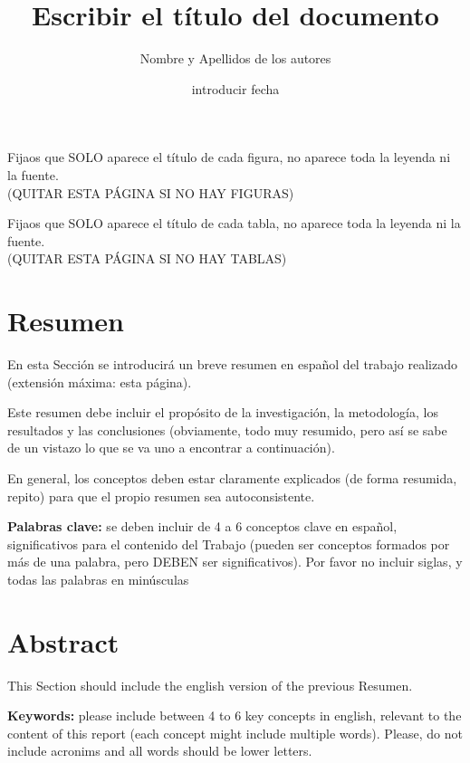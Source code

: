\documentclass[11pt,a4paper,spanish]{book}
\title{Escribir el título del documento}
\author{Nombre y Apellidos de los autores}
\date{introducir fecha}
\begin{document}
\renewcommand{\listfigurename}{Índice de figuras}
\renewcommand{\listtablename}{Índice de tablas}
\renewcommand{\contentsname}{Índice de contenidos}
\renewcommand{\figurename}{Figura}
\renewcommand{\tablename}{Tabla} 

\maketitle
\frontmatter
\tableofcontents
\listoffigures
Fijaos que SOLO aparece el título de cada figura, no aparece toda la leyenda ni la fuente. \\
(QUITAR ESTA PÁGINA SI NO HAY FIGURAS) 
\listoftables
Fijaos que SOLO aparece el título de cada tabla, no aparece toda la leyenda ni la fuente. \\
(QUITAR ESTA PÁGINA SI NO HAY TABLAS)

\chapter{Resumen}
En esta Sección se introducirá un breve resumen en español del trabajo realizado (extensión máxima: esta página). 
\newline

Este resumen debe incluir el propósito de la investigación, la metodología, los resultados y las conclusiones (obviamente, todo muy resumido, pero así se sabe de un vistazo lo que se va uno a encontrar a continuación). 
\newline

En general, los conceptos deben estar claramente explicados (de forma resumida, repito) para que el propio resumen sea autoconsistente.

\vspace{0.5cm}
{\bf Palabras clave:} se deben incluir de 4 a 6 conceptos clave en español, significativos para el contenido del Trabajo (pueden ser conceptos formados por más de una palabra, pero DEBEN ser significativos). Por favor no incluir siglas, y todas las palabras en minúsculas

\chapter{Abstract}
This Section should include the english version of the previous Resumen.

\vspace{0.5cm}
{\bf Keywords:} please include between 4 to 6 key concepts in english, relevant to the content of this report (each concept might include multiple words). Please, do not include acronims and all words should be lower letters.
\end{document}
